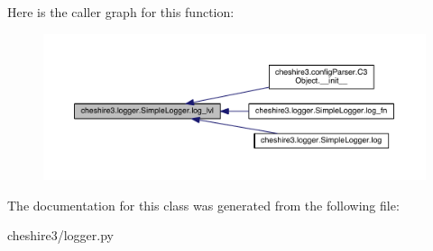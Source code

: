 Here is the caller graph for this function\-:
\nopagebreak
\begin{figure}[H]
\begin{center}
\leavevmode
\includegraphics[width=350pt]{classcheshire3_1_1logger_1_1_simple_logger_ad595a002416bead25edf60d452430e85_icgraph}
\end{center}
\end{figure}




The documentation for this class was generated from the following file\-:\begin{DoxyCompactItemize}
\item 
cheshire3/logger.\-py\end{DoxyCompactItemize}
